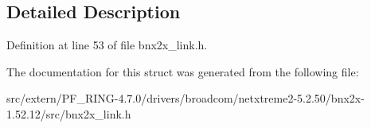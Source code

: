 \subsection{Detailed Description}


Definition at line 53 of file bnx2x\_\-link.h.



The documentation for this struct was generated from the following file:\begin{DoxyCompactItemize}
\item 
src/extern/PF\_\-RING-\/4.7.0/drivers/broadcom/netxtreme2-\/5.2.50/bnx2x-\/1.52.12/src/bnx2x\_\-link.h\end{DoxyCompactItemize}

